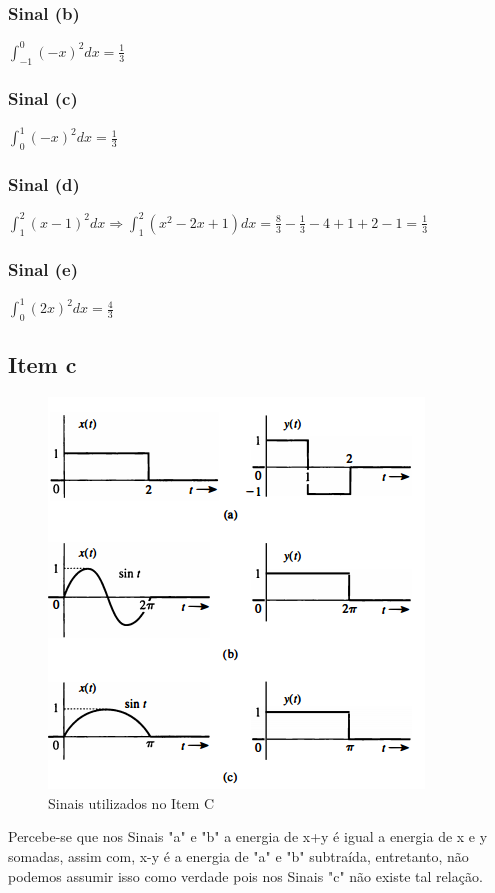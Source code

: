 \documentclass[a4paper, 12pt]{article}
\begin{document}
            \subsubsection{Sinal (b)}
            $\int_{-1}^{0} (-x)^{2}dx  = \frac{1}{3}$
            \subsubsection{Sinal (c)}
            $\int_{0}^{1} (-x)^{2}dx  = \frac{1}{3}$
            \subsubsection{Sinal (d)}
            $\int_{1}^{2} (x-1)^{2}dx  \Rightarrow \int_{1}^{2} (x^{2}-2x+1)dx = \frac{8}{3} - \frac{1}{3} - 4 +1 + 2 -1 = \frac{1}{3}$
            \subsubsection{Sinal (e)}
            $\int_{0}^{1} (2x)^{2}dx  = \frac{4}{3}$
        \subsection{Item c}
            \begin{figure}[!ht]
                \centering
                \includegraphics{img/Figura3.PNG}
                \caption{Sinais utilizados no Item C}
            \end{figure}
            Percebe-se que nos Sinais "a" e "b" a energia de x+y é igual a energia de x e y somadas, assim com, x-y é a energia de "a" e "b" subtraída, entretanto, não podemos assumir isso como verdade pois nos Sinais "c" não existe tal relação.
\end{document}
